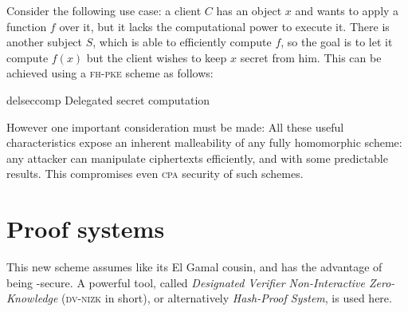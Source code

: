Consider the following use case: a client $C$ has an object $x$ and wants to apply a function $f$ over it, but it lacks the computational power to execute it. There is another subject $S$, which is able to efficiently compute $f$, so the goal is to let it compute $f(x)$ but the client wishes to keep $x$ secret from him. This can be achieved using a \textsc{fh-pke} scheme as follows:


\begin{cryptosequence}
    {delseccomp}
    {Delegated secret computation}


    \cseqdelay


    \cseqdelay
    \cseqdelay


\end{cryptosequence}


However one important consideration must be made: All these useful characteristics expose an inherent malleability of any fully homomorphic scheme: any attacker can manipulate ciphertexts efficiently, and with some predictable results. This compromises even \textsc{cpa} security of such schemes.

\section{Proof systems}

This new scheme assumes \ddh{} like its El Gamal cousin, and has the advantage of being \cca-secure. A powerful tool, called \emph{Designated Verifier Non-Interactive Zero-Knowledge} (\textsc{dv-nizk} in short), or alternatively \emph{Hash-Proof System}, is used here.


